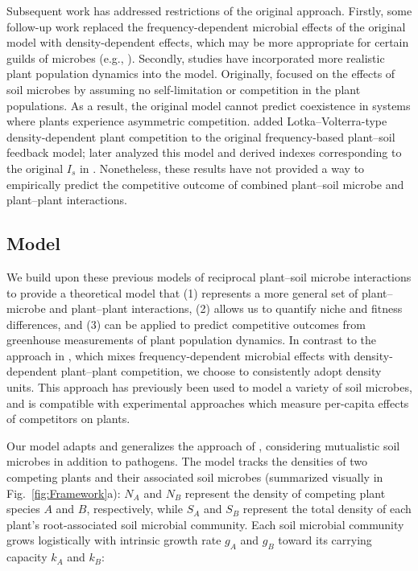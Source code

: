 Subsequent work has addressed restrictions of the original approach.
Firstly, some follow-up work replaced the frequency-dependent microbial effects of the original model with density-dependent effects, which may be more appropriate for certain guilds of microbes (e.g., \citealt{Umbanhowar2005, Eppinga2006}).
Secondly, studies have incorporated more realistic plant population dynamics into the model. Originally, \citet{Bever1997} focused on the effects of soil microbes by assuming no self-limitation or competition in the plant populations. As a result, the original model cannot predict coexistence in systems where plants experience asymmetric competition. \citet{Bever2003} added Lotka--Volterra-type density-dependent plant competition to the original frequency-based plant--soil feedback model; \citet{Revilla2013} later analyzed this model and derived indexes corresponding to the original $I_{s}$ in \citet{Bever1997}. Nonetheless, these results have not provided a way to empirically predict the competitive outcome of combined plant--soil microbe and plant--plant interactions.
\par



\subsection{Model}
We build upon these previous models of reciprocal plant--soil microbe interactions to provide a theoretical model that (1) represents a more general set of plant--microbe and plant--plant interactions, (2) allows us to quantify niche and fitness differences, and (3) can be applied to predict competitive outcomes from greenhouse measurements of plant population dynamics.
In contrast to the approach in \citet{Bever2003}, which mixes frequency-dependent microbial effects with density-dependent plant--plant competition, we choose to consistently adopt density units. This approach has previously been used to model a variety of
soil microbes, and is compatible with experimental approaches which measure per-capita effects of competitors on plants.
\par


Our model adapts and generalizes the approach of \citet{Eppinga2006}, considering mutualistic soil microbes in addition to pathogens. The model tracks the densities of two competing plants and their associated soil microbes (summarized visually in Fig.~\ref{fig:Framework}a): $N_{A}$ and $N_{B}$ represent the density of competing plant species $A$ and $B$, respectively, while $S_{A}$ and $S_{B}$ represent the total density of each plant's root-associated soil microbial community. Each soil microbial community grows logistically with intrinsic growth rate $g_{A}$ and $g_{B}$ toward its carrying capacity $k_{A}$ and $k_{B}$:

